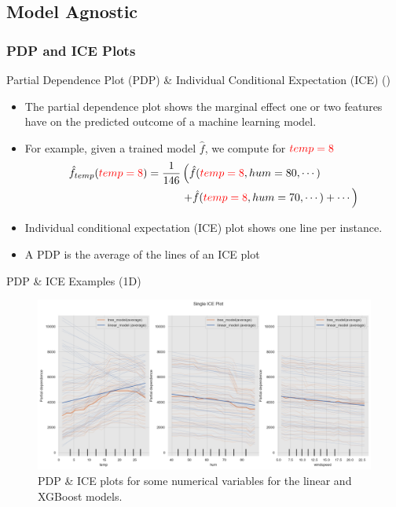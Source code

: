 \documentclass[10pt]{beamer}
\begin{document}
\subsection{Model Agnostic}

\subsubsection{PDP and ICE Plots}

\begin{frame}{Partial Dependence Plot (PDP) \& Individual Conditional Expectation (ICE) (\cite[Section 8.1 \& 9.1]{molnar2019})}
\begin{itemize}
\item The partial dependence plot shows the marginal effect one or two features have on the predicted outcome of a machine learning model. 
\item For example, given a trained model $\hat{f}$, we compute for $\textcolor{red}{temp=8}$
\begin{align*}
\hat{f}_{temp}(\textcolor{red}{temp=8}) = 
\frac{1}{146}
& \left(\hat{f}(\textcolor{red}{temp=8}, hum=80, \cdots) \right.\\
& \left. + \hat{f}(\textcolor{red}{temp=8}, hum=70, \cdots)  + \cdots \right)
\end{align*}
\pause
\item Individual conditional expectation (ICE) plot shows one line per instance. 
\item A PDP is the average of the lines of an ICE plot
\end{itemize}
\end{frame}

\begin{frame}{PDP \& ICE Examples (1D)}
\begin{center}
  \begin{figure}
    \includegraphics[scale=0.35]{images/interpretable_ml_104_0.png}
    \caption{PDP \& ICE plots for some numerical variables for the linear and XGBoost models.}\label{fig:pdp-ice}
  \end{figure}
\end{center}
\end{frame}
\end{document}

